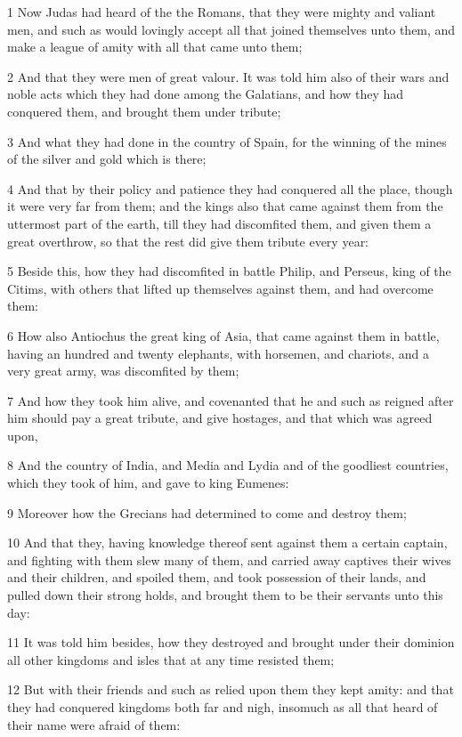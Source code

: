 \par 1 Now Judas had heard of the the Romans, that they were mighty and valiant men, and such as would lovingly accept all that joined themselves unto them, and make a league of amity with all that came unto them;
\par 2 And that they were men of great valour. It was told him also of their wars and noble acts which they had done among the Galatians, and how they had conquered them, and brought them under tribute;
\par 3 And what they had done in the country of Spain, for the winning of the mines of the silver and gold which is there;
\par 4 And that by their policy and patience they had conquered all the place, though it were very far from them; and the kings also that came against them from the uttermost part of the earth, till they had discomfited them, and given them a great overthrow, so that the rest did give them tribute every year:
\par 5 Beside this, how they had discomfited in battle Philip, and Perseus, king of the Citims, with others that lifted up themselves against them, and had overcome them:
\par 6 How also Antiochus the great king of Asia, that came against them in battle, having an hundred and twenty elephants, with horsemen, and chariots, and a very great army, was discomfited by them;
\par 7 And how they took him alive, and covenanted that he and such as reigned after him should pay a great tribute, and give hostages, and that which was agreed upon,
\par 8 And the country of India, and Media and Lydia and of the goodliest countries, which they took of him, and gave to king Eumenes:
\par 9 Moreover how the Grecians had determined to come and destroy them;
\par 10 And that they, having knowledge thereof sent against them a certain captain, and fighting with them slew many of them, and carried away captives their wives and their children, and spoiled them, and took possession of their lands, and pulled down their strong holds, and brought them to be their servants unto this day:
\par 11 It was told him besides, how they destroyed and brought under their dominion all other kingdoms and isles that at any time resisted them;
\par 12 But with their friends and such as relied upon them they kept amity: and that they had conquered kingdoms both far and nigh, insomuch as all that heard of their name were afraid of them:
